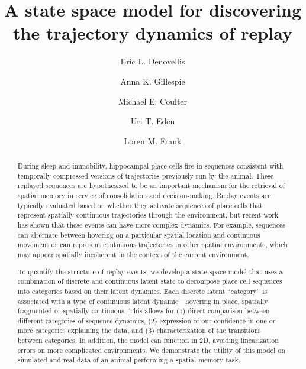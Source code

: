 \documentclass[times, twoside]{zHenriquesLab-StyleBioRxiv}
\begin{document}
\title{A state space model for discovering the trajectory dynamics of replay}

\author[4]{Eric L. Denovellis}
\author[2, 3]{Anna K. Gillespie}
\author[2, 3]{Michael E. Coulter}
\author[1]{Uri T. Eden}
\author[2, 3, 4, \Letter]{Loren M. Frank}



\maketitle

\begin{abstract}
During sleep and immobility, hippocampal place cells fire in sequences consistent with temporally compressed versions of trajectories previously run by the animal. These replayed sequences are hypothesized to be an important mechanism for the retrieval of spatial memory in service of consolidation and decision-making. Replay events are typically evaluated based on whether they activate sequences of place cells that represent spatially continuous trajectories through the environment, but recent work has shown that these events can have more complex dynamics. For example, sequences can alternate between hovering on a particular spatial location and continuous movement or can represent continuous trajectories in other spatial environments, which may appear spatially incoherent in the context of the current environment.

To quantify the structure of replay events, we develop a state space model that uses a combination of discrete and continuous latent state to decompose place cell sequences into categories based on their latent dynamics. Each discrete latent “category” is associated with a type of continuous latent dynamic—hovering in place, spatially fragmented or spatially continuous. This allows for (1) direct comparison between different categories of sequence dynamics, (2) expression of our confidence in one or more categories explaining the data, and (3) characterization of the transitions between categories. In addition, the model can function in 2D, avoiding linearization errors on more complicated environments. We demonstrate the utility of this model on simulated and real data of an animal performing a spatial memory task.

\end {abstract}
\end{document}
